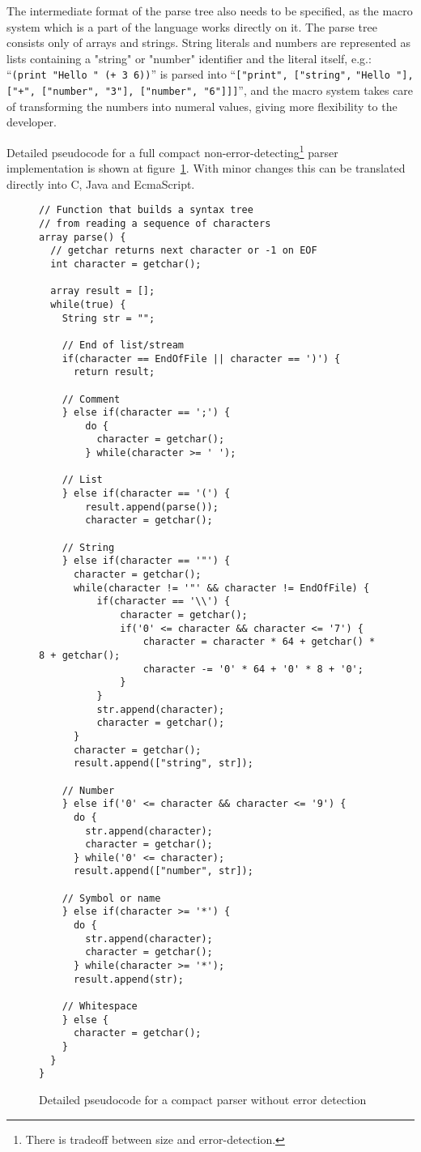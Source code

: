 The intermediate format of the parse tree also needs to be specified, as the macro system which is a part of the language works directly on it. 
The parse tree consists only of arrays and strings. String literals and numbers are represented as lists containing a "string" or "number" identifier and the literal itself, e.g.: ``\verb|(print "Hello " (+ 3 6))|'' is parsed into ``\verb|["print", ["string",| \verb|"Hello "],| \verb|["+", ["number", "3"], ["number", "6"]]]|'', and the macro system takes care of transforming the numbers into numeral values, giving more flexibility to the developer.

Detailed pseudocode for a full compact non-error-detecting\footnote{There is tradeoff between size and error-detection.} parser implementation is shown at figure~\ref{parsercode}. With minor changes this can be translated directly into C, Java and EcmaScript.
\begin{figure}
{\scriptsize
\begin{verbatim}
// Function that builds a syntax tree 
// from reading a sequence of characters
array parse() {
  // getchar returns next character or -1 on EOF
  int character = getchar(); 

  array result = [];
  while(true) {
    String str = "";

    // End of list/stream
    if(character == EndOfFile || character == ')') {
      return result;

    // Comment
    } else if(character == ';') {
        do {
          character = getchar();
        } while(character >= ' ');

    // List
    } else if(character == '(') {
        result.append(parse());
        character = getchar();

    // String
    } else if(character == '"') {
      character = getchar();
      while(character != '"' && character != EndOfFile) {
          if(character == '\\') {
              character = getchar();
              if('0' <= character && character <= '7') {
                  character = character * 64 + getchar() * 8 + getchar();
                  character -= '0' * 64 + '0' * 8 + '0';
              }
          }
          str.append(character);
          character = getchar();
      }
      character = getchar();
      result.append(["string", str]);

    // Number
    } else if('0' <= character && character <= '9') {
      do {
        str.append(character);
        character = getchar();
      } while('0' <= character);
      result.append(["number", str]);

    // Symbol or name
    } else if(character >= '*') {
      do {
        str.append(character);
        character = getchar();
      } while(character >= '*');
      result.append(str);

    // Whitespace
    } else {
      character = getchar();
    }
  }
}
\end{verbatim}
}
\caption{Detailed pseudocode for a compact parser without error detection}
\label{parsercode}
\end{figure}

